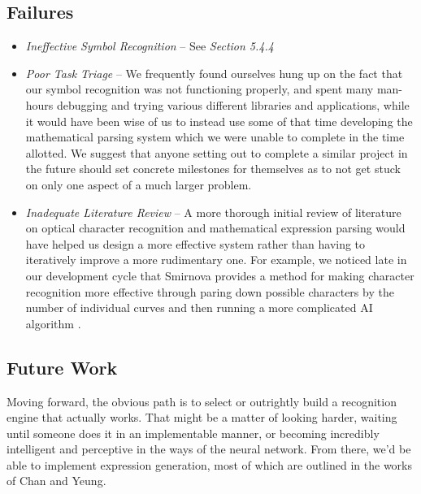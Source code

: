 \documentclass{acm_proc_article-sp}
\begin{document}
\subsection{Failures}
\begin{itemize}
	\item{\emph{Ineffective Symbol Recognition}} -- See \emph{Section 5.4.4}
	\item{\emph{Poor Task Triage}} -- We frequently found ourselves hung up on the fact that our symbol recognition was not functioning properly, and spent many man-hours debugging and trying various different libraries and applications, while it would have been wise of us to instead use some of that time developing the mathematical parsing system which we were unable to complete in the time allotted. We suggest that anyone setting out to complete a similar project in the future should set concrete milestones for themselves as to not get stuck on only one aspect of a much larger problem.
	\item{\emph{Inadequate Literature Review}} -- A more thorough initial review of literature on optical character recognition and mathematical expression parsing would have helped us design a more effective system rather than having to iteratively improve a more rudimentary one. For example, we noticed late in our development cycle that Smirnova provides a method for making character recognition more effective through paring down possible characters by the number of individual curves and then running a more complicated AI algorithm \cite{smirnova_pen-based_2006}. 

	
	\end{itemize}

\subsection{Future Work}
Moving forward, the obvious path is to select or outrightly build a recognition engine that actually works. That might be a matter of looking harder, waiting until someone does it in an implementable manner, or becoming incredibly intelligent and perceptive in the ways of the neural network. From there, we'd be able to implement expression generation, most of which are outlined in the works of Chan and Yeung\cite{chan_mathematical_2000}. 
\end{document}
